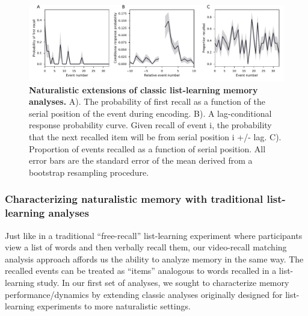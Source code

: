 \documentclass{article}
\begin{document}
{\begin{figure}[t!]
\centering
\includegraphics[width=1\textwidth]{figs/3_list_learning.pdf}
\caption{\small \textbf{Naturalistic extensions of classic list-learning memory analyses.} A). The probability of first recall as a function of the serial position of the event during encoding. B). A lag-conditional response probability curve. Given recall of event i, the probability that the next recalled item will be from serial position i +/- lag. C). Proportion of events recalled as a function of serial position. All error bars are the standard error of the mean derived from a bootstrap resampling procedure.}
\label{fig:list-learning}
\end{figure}

\subsubsection{Characterizing naturalistic memory with traditional list-learning analyses}
Just like in a traditional ``free-recall'' list-learning experiment where participants view a list of words and then verbally recall them, our video-recall matching analysis approach affords us the ability to analyze memory in the same way. The recalled events can be treated as ``items'' analogous to words recalled in a list-learning study. In our first set of analyses, we sought to characterize memory performance/dynamics by extending classic analyses originally designed for list-learning experiments to more naturalistic settings.

}
\end{document}

